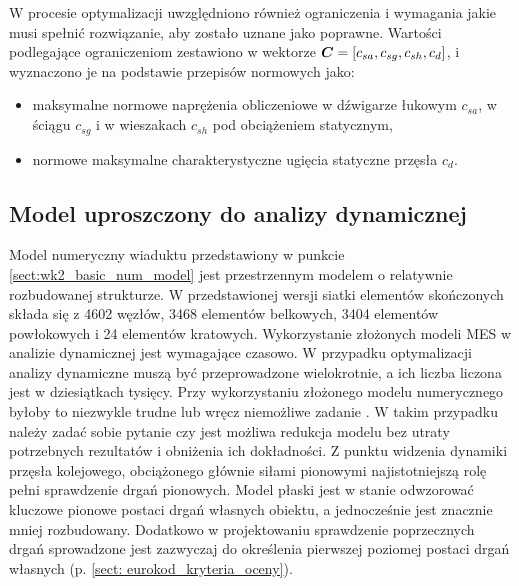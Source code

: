 W procesie optymalizacji uwzględniono również ograniczenia i wymagania jakie musi spełnić rozwiązanie, aby zostało uznane jako poprawne. Wartości podlegające ograniczeniom zestawiono w wektorze $\bm{C}=[c_{sa},c_{sg},c_{sh},c_{d}]$, i wyznaczono je na podstawie przepisów normowych \parencite{PKNc,PKNj} jako:
\begin{itemize}
	\item maksymalne normowe naprężenia obliczeniowe w dźwigarze łukowym $c_{sa}$, w ściągu $c_{sg}$ i w wieszakach $c_{sh}$ pod obciążeniem statycznym,
	\item normowe maksymalne charakterystyczne ugięcia statyczne przęsła $c_{d}$.
\end{itemize}
\subsection{Model uproszczony do analizy dynamicznej}

Model numeryczny wiaduktu przedstawiony w punkcie \ref{sect:wk2_basic_num_model} jest przestrzennym modelem o relatywnie rozbudowanej strukturze. W przedstawionej wersji siatki elementów skończonych składa się z 4602 węzłów, 3468 elementów belkowych, 3404 elementów powłokowych i 24 elementów kratowych. Wykorzystanie złożonych modeli MES w analizie dynamicznej jest wymagające czasowo. W przypadku optymalizacji analizy dynamiczne muszą być przeprowadzone wielokrotnie, a ich liczba liczona jest w dziesiątkach tysięcy. Przy wykorzystaniu złożonego modelu numerycznego byłoby to niezwykle trudne lub wręcz niemożliwe zadanie \parencite{Zotowski2017c}. W takim przypadku należy zadać sobie pytanie czy jest możliwa redukcja modelu bez utraty potrzebnych rezultatów i obniżenia ich dokładności. Z punktu widzenia dynamiki przęsła kolejowego, obciążonego głównie siłami pionowymi najistotniejszą rolę pełni sprawdzenie drgań pionowych. Model płaski jest w stanie odwzorować kluczowe pionowe postaci drgań własnych obiektu, a jednocześnie jest znacznie mniej rozbudowany. Dodatkowo w projektowaniu sprawdzenie poprzecznych drgań sprowadzone jest zazwyczaj do określenia pierwszej poziomej postaci drgań własnych (p. \ref{sect: eurokod_kryteria_oceny}).  



